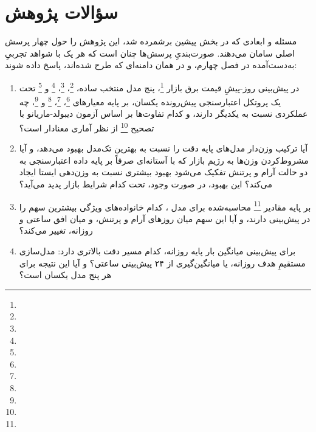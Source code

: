 
\section{سؤالات پژوهش}

مسئله و ابعادی که در بخش پیشین برشمرده شد، این پژوهش را حول چهار پرسش اصلی سامان
می‌دهند. صورت‌بندیِ پرسش‌ها چنان است که هر یک با شواهد تجربیِ به‌دست‌آمده
در فصل چهارم، و در همان دامنه‌ای که طرح شده‌اند، پاسخ داده شوند:

\begin{enumerate}
\item در پیش‌بینی روز-پیشِ قیمت برق بازار \footnote{}، پنج مدل منتخب 
ساده، \footnote{}، \footnote{}، \footnote{} و \footnote{}  تحت یک
پروتکل اعتبارسنجی پیش‌رونده یکسان، بر پایه معیارهای \footnote{}، \footnote{}،
\footnote{} و \footnote{}، چه عملکردی نسبت به یکدیگر دارند، و کدام تفاوت‌ها بر اساس
آزمون دیبولد-ماریانو با تصحیح \footnote{} از نظر آماری معنادار است؟

\item آیا ترکیب وزن‌دار مدل‌های پایه دقت را نسبت به بهترین تک‌مدل بهبود می‌دهد، و
آیا مشروط‌کردن وزن‌ها به رژیم بازار  که با آستانه‌ای صرفاً بر پایه داده
اعتبارسنجی به دو حالت آرام و پرتنش تفکیک می‌شود  بهبود بیشتری نسبت به
وزن‌دهی ایستا ایجاد می‌کند؟ این بهبود، در صورت وجود، تحت کدام شرایط بازار پدید
می‌آید؟

\item بر پایه مقادیر \footnote{} محاسبه‌شده برای مدل ، کدام
خانواده‌های ویژگی بیشترین سهم را در پیش‌بینی دارند، و آیا این سهم میان روزهای آرام
و پرتنش، و میان افق ساعتی و روزانه، تغییر می‌کند؟

\item برای پیش‌بینی میانگین بار پایه روزانه، کدام مسیر دقت بالاتری دارد:
مدل‌سازی مستقیمِ هدف روزانه، یا میانگین‌گیری از ۲۴ پیش‌بینی ساعتی؟ و آیا این
نتیجه برای هر پنج مدل یکسان است؟
\end{enumerate}
